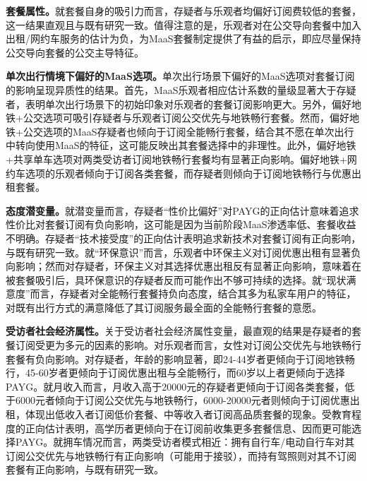 \textbf{套餐属性。}就套餐自身的吸引力而言，存疑者与乐观者均偏好订阅费较低的套餐，这一结果直观且与既有研究一致\citep{caiatiBundlingPricingSchemes2020,matyasPotentialMobilityService2019,liuUnderstandingImpactOccasional2023}。值得注意的是，乐观者对在公交导向套餐中加入出租/网约车服务的估计为负，为MaaS套餐制定提供了有益的启示，即应尽量保持公交导向套餐的公交主导特征。

\textbf{单次出行情境下偏好的MaaS选项。}单次出行场景下偏好的MaaS选项对套餐订阅的影响呈现异质性的结果。首先，MaaS乐观者相应估计系数的量级显著大于存疑者，表明单次出行场景下的初始印象对乐观者的套餐订阅影响更大。另外，偏好地铁+公交选项可吸引存疑者与乐观者订阅公交优先与地铁畅行套餐。然而，偏好地铁+公交选项的MaaS存疑者也倾向于订阅全能畅行套餐，结合其不愿在单次出行中转向使用MaaS的特征，这可能反映出其套餐选择中的非理性。此外，偏好地铁+共享单车选项对两类受访者订阅地铁畅行套餐均有显著正向影响。偏好地铁+网约车选项的乐观者倾向于订阅各类套餐，而存疑者则倾向于订阅地铁畅行与优惠出租套餐。

\textbf{态度潜变量。}就潜变量而言，存疑者``性价比偏好''对PAYG的正向估计意味着追求性价比对套餐订阅有负向影响，这可能是因为当前阶段MaaS渗透率低、套餐收益不明确\citep{liuUnderstandingImpactOccasional2023}。存疑者``技术接受度''的正向估计表明追求新技术对套餐订阅有正向影响，与既有研究一致\citep{kimInfluenceLatentLifestyle2022}。就``环保意识''而言，乐观者中环保主义对订阅优惠出租有显著负向影响；然而对存疑者，环保主义对其选择优惠出租反有显著正向影响，意味着在被套餐吸引后，具环保意识的存疑者反而可能作出不够可持续的选择。就``现状满意度''而言，存疑者对全能畅行套餐持负向态度，结合其多为私家车用户的特征，对既有出行方式的满意降低了其订阅服务最全面的全能畅行套餐的意愿。

\textbf{受访者社会经济属性。}关于受访者社会经济属性变量，最直观的结果是存疑者的套餐订阅受更为多元的因素的影响。对乐观者而言，女性对订阅公交优先与地铁畅行套餐有负向影响。对存疑者，年龄的影响显著，即24-44岁者更倾向于订阅地铁畅行，45-60岁者更倾向于订阅优惠出租与全能畅行，而60岁以上者更倾向于选择PAYG。就月收入而言，月收入高于20000元的存疑者更倾向于订阅各类套餐，低于6000元者倾向于订阅公交优先与地铁畅行，6000-20000元者则倾向于订阅优惠出租，体现出低收入者订阅低价套餐、中等收入者订阅高品质套餐的现象。受教育程度的正向估计表明，高学历者更倾向于在订阅前收集更多套餐信息、因而更可能选择PAYG。就拥车情况而言，两类受访者模式相近：拥有自行车/电动自行车对其订阅公交优先与地铁畅行有正向影响（可能用于接驳），而持有驾照则对其不订阅套餐有正向影响，与既有研究一致\citep{smithMobilityServiceDevelopment2018,alonso-gonzalezDriversBarriersAdopting2020}。

